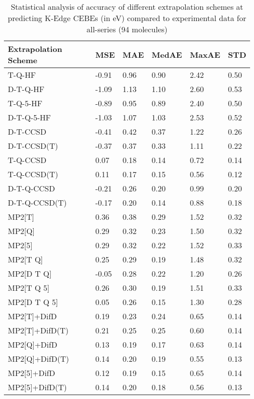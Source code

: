 \begin{table}
  \caption{Statistical analysis of accuracy of different extrapolation schemes at predicting K-Edge CEBEs (in eV) compared to experimental data for all-series (94 molecules)}
  \label{tbl:summary-all}
  \begin{tabular}{l l l l l l }
    \toprule
    \textbf{Extrapolation Scheme} & \textbf{MSE} & \textbf{MAE} & \textbf{MedAE} & \textbf{MaxAE} & \textbf{STD} \\ 
    \midrule
    T-Q-HF & -0.91 & 0.96 & 0.90 & 2.42 & 0.50 \\ 
    D-T-Q-HF & -1.09 & 1.13 & 1.10 & 2.60 & 0.53 \\ 
    T-Q-5-HF & -0.89 & 0.95 & 0.89 & 2.40 & 0.50 \\ 
    D-T-Q-5-HF & -1.03 & 1.07 & 1.03 & 2.53 & 0.52 \\ 
    D-T-CCSD & -0.41 & 0.42 & 0.37 & 1.22 & 0.26 \\ 
    D-T-CCSD(T) & -0.37 & 0.37 & 0.33 & 1.11 & 0.22 \\ 
    T-Q-CCSD & 0.07 & 0.18 & 0.14 & 0.72 & 0.14 \\ 
    T-Q-CCSD(T) & 0.11 & 0.17 & 0.15 & 0.56 & 0.12 \\ 
    D-T-Q-CCSD & -0.21 & 0.26 & 0.20 & 0.99 & 0.20 \\ 
    D-T-Q-CCSD(T) & -0.17 & 0.20 & 0.14 & 0.88 & 0.18 \\ 
    MP2[T] & 0.36 & 0.38 & 0.29 & 1.52 & 0.32 \\ 
    MP2[Q] & 0.29 & 0.32 & 0.23 & 1.50 & 0.32 \\ 
    MP2[5] & 0.29 & 0.32 & 0.22 & 1.52 & 0.33 \\ 
    MP2[T Q] & 0.25 & 0.29 & 0.19 & 1.48 & 0.32 \\ 
    MP2[D T Q] & -0.05 & 0.28 & 0.22 & 1.20 & 0.26 \\ 
    MP2[T Q 5] & 0.26 & 0.30 & 0.19 & 1.51 & 0.33 \\ 
    MP2[D T Q 5] & 0.05 & 0.26 & 0.15 & 1.30 & 0.28 \\ 
    MP2[T]+DifD & 0.19 & 0.23 & 0.24 & 0.65 & 0.14 \\ 
    MP2[T]+DifD(T) & 0.21 & 0.25 & 0.25 & 0.60 & 0.14 \\ 
    MP2[Q]+DifD & 0.13 & 0.19 & 0.17 & 0.63 & 0.14 \\ 
    MP2[Q]+DifD(T) & 0.14 & 0.20 & 0.19 & 0.55 & 0.13 \\ 
    MP2[5]+DifD & 0.12 & 0.19 & 0.15 & 0.65 & 0.14 \\ 
    MP2[5]+DifD(T) & 0.14 & 0.20 & 0.18 & 0.56 & 0.13 \\ 

\end{tabular}
\end{table}

